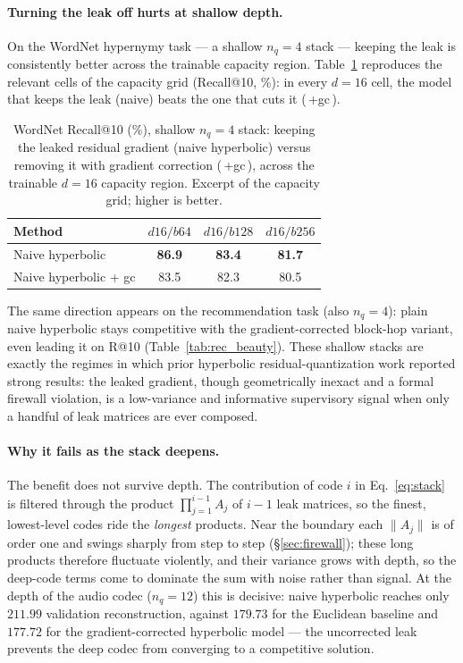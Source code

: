 \documentclass[12pt]{report}
\begin{document}
\paragraph{Turning the leak off hurts at shallow depth.}
On the WordNet hypernymy task --- a shallow $n_q=4$ stack --- keeping the leak is consistently better across the trainable capacity region. Table~\ref{tab:gc_leak} reproduces the relevant cells of the capacity grid (Recall@10, \%): in every $d{=}16$ cell, the model that keeps the leak (naive) beats the one that cuts it (\,+gc\,).
\begin{table}[h]
\centering
\caption{WordNet Recall@10 (\%), shallow $n_q=4$ stack: keeping the leaked residual gradient (naive hyperbolic) versus removing it with gradient correction (\,+gc\,), across the trainable $d{=}16$ capacity region. Excerpt of the capacity grid; higher is better.}
\label{tab:gc_leak}
\begin{tabular}{lccc}
\hline
Method & $d16/b64$ & $d16/b128$ & $d16/b256$ \\
\hline
Naive hyperbolic       & \textbf{86.9} & \textbf{83.4} & \textbf{81.7} \\
Naive hyperbolic + gc  & 83.5 & 82.3 & 80.5 \\
\hline
\end{tabular}
\end{table}
The same direction appears on the recommendation task (also $n_q=4$): plain naive hyperbolic stays competitive with the gradient-corrected block-hop variant, even leading it on R@10 (Table~\ref{tab:rec_beauty}). These shallow stacks are exactly the regimes in which prior hyperbolic residual-quantization work reported strong results: the leaked gradient, though geometrically inexact and a formal firewall violation, is a low-variance and informative supervisory signal when only a handful of leak matrices are ever composed.

\paragraph{Why it fails as the stack deepens.}
The benefit does not survive depth. The contribution of code $i$ in Eq.~\ref{eq:stack} is filtered through the product $\prod_{j=1}^{i-1}A_j$ of $i-1$ leak matrices, so the finest, lowest-level codes ride the \emph{longest} products. Near the boundary each $\|A_j\|$ is of order one and swings sharply from step to step (\S\ref{sec:firewall}); these long products therefore fluctuate violently, and their variance grows with depth, so the deep-code terms come to dominate the sum with noise rather than signal. At the depth of the audio codec ($n_q=12$) this is decisive: naive hyperbolic reaches only $211.99$ validation reconstruction, against $179.73$ for the Euclidean baseline and $177.72$ for the gradient-corrected hyperbolic model --- the uncorrected leak prevents the deep codec from converging to a competitive solution.
\end{document}
